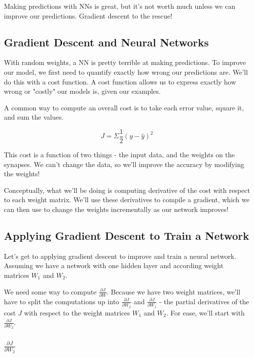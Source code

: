 \documentclass[]{article}
\begin{document}
Making predictions with NNs is great, but it's not worth much unless we can improve our predictions. Gradient descent to the rescue!

\subsection{Gradient Descent and Neural Networks}
With random weights, a NN is pretty terrible at making predictions. To improve our model, we first need to quantify exactly how wrong our predictions are. We'll do this with a cost function. A cost function allows us to express exactly how wrong or "costly" our models is, given our examples.

A common way to compute an overall cost is to take each error value, square it, and sum the values.

\begin{equation}
	J = \Sigma \frac{1}{2}(y- \hat{y})^{2}
\end{equation}

This cost is a function of two things - the input data, and the weights on the synapses. We can't change the data, so we'll improve the accuracy by modifying the weights!

Conceptually, what we'll be doing is computing derivative of the cost with respect to each weight matrix. We'll use these derivatives to compile a gradient, which we can then use to change the weights incrementally as our network improves!


\subsection{Applying Gradient Descent to Train a Network}
Let's get to applying gradient descent to improve and train a neural network. Assuming we have a network with one hidden layer and according weight matrices $W_1$ and $W_2$.

We need some way to compute $\frac{\partial J}{\partial W}$. Because we have two weight matrices, we'll have to split the computations up into $\frac{\partial J}{\partial W_2}$ and $\frac{\partial J}{\partial W_1}$ - the partial derivatives of the cost $J$ with respect to the weight matrices $W_1$ and $W_2$. For ease, we'll start with $\frac{\partial J}{\partial W_2}$.

\subsubsection{$\frac{\partial J}{\partial W_2}$}
\end{document}
